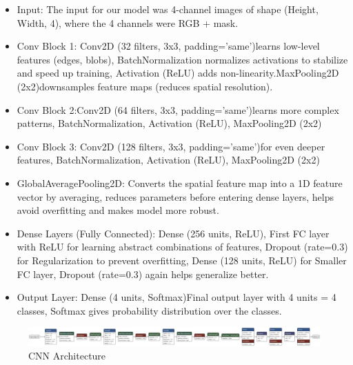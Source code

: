 \documentclass{article}
\begin{document}
\begin{itemize}
    \item Input: The input for our model was 4-channel images of shape (Height, Width, 4), where the 4 channels were  RGB + mask.
    \item Conv Block 1: Conv2D (32 filters, 3x3, padding='same')learns low-level features (edges, blobs), BatchNormalization normalizes activations to stabilize and speed up training, Activation (ReLU) adds non-linearity.MaxPooling2D (2x2)downsamples feature maps (reduces spatial resolution).
    \item Conv Block 2:Conv2D (64 filters, 3x3, padding='same')learns more complex patterns, BatchNormalization, Activation (ReLU), MaxPooling2D (2x2)
    \item Conv Block 3:	Conv2D (128 filters, 3x3, padding='same')for even deeper features, BatchNormalization,	Activation (ReLU), MaxPooling2D (2x2)
    \item GlobalAveragePooling2D: Converts the spatial feature map into a 1D feature vector by averaging, reduces parameters before entering dense layers,	helps avoid overfitting and makes model more robust.
    \item Dense Layers (Fully Connected): Dense (256 units, ReLU), First FC layer with ReLU for learning abstract combinations of features, Dropout (rate=0.3) for Regularization to prevent overfitting, Dense (128 units, ReLU) for Smaller FC layer,	Dropout (rate=0.3) again helps generalize better.
    \item Output Layer: Dense (4 units, Softmax)Final output layer with 4 units = 4 classes, Softmax gives probability distribution over the classes.

\end{itemize}


\begin{figure}[h!] %
    \centering
    \includegraphics[width=1.0\linewidth]{model_cnnmask1.keras.png}
    \caption{CNN Architecture}
    \label{fig:model_cnnmask1.keras.png}
\end{figure}
\end{document}
